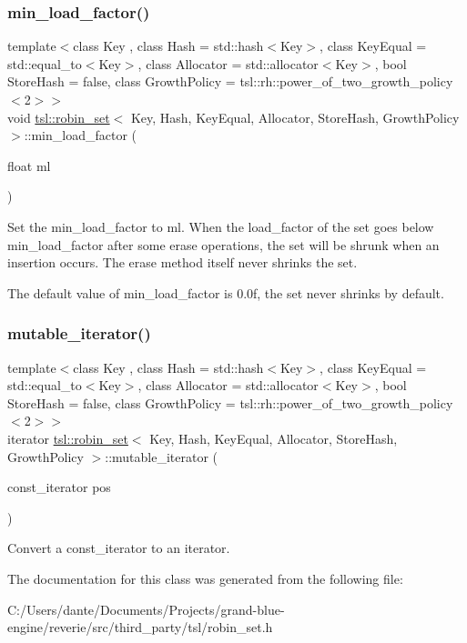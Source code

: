 \subsubsection{\texorpdfstring{min\_load\_factor()}{min\_load\_factor()}}
{\footnotesize\ttfamily template$<$class Key , class Hash  = std\+::hash$<$\+Key$>$, class Key\+Equal  = std\+::equal\+\_\+to$<$\+Key$>$, class Allocator  = std\+::allocator$<$\+Key$>$, bool Store\+Hash = false, class Growth\+Policy  = tsl\+::rh\+::power\+\_\+of\+\_\+two\+\_\+growth\+\_\+policy$<$2$>$$>$ \\
void \mbox{\hyperlink{classtsl_1_1robin__set}{tsl\+::robin\+\_\+set}}$<$ Key, Hash, Key\+Equal, Allocator, Store\+Hash, Growth\+Policy $>$\+::min\+\_\+load\+\_\+factor (\begin{DoxyParamCaption}\item[{float}]{ml }\end{DoxyParamCaption})\hspace{0.3cm}{\ttfamily [inline]}}

Set the {\ttfamily min\+\_\+load\+\_\+factor} to {\ttfamily ml}. When the {\ttfamily load\+\_\+factor} of the set goes below {\ttfamily min\+\_\+load\+\_\+factor} after some erase operations, the set will be shrunk when an insertion occurs. The erase method itself never shrinks the set.

The default value of {\ttfamily min\+\_\+load\+\_\+factor} is 0.\+0f, the set never shrinks by default. \mbox{\label{classtsl_1_1robin__set_aebd376e4762e1e4091df9cc19917334e}} 
\subsubsection{\texorpdfstring{mutable\_iterator()}{mutable\_iterator()}}
{\footnotesize\ttfamily template$<$class Key , class Hash  = std\+::hash$<$\+Key$>$, class Key\+Equal  = std\+::equal\+\_\+to$<$\+Key$>$, class Allocator  = std\+::allocator$<$\+Key$>$, bool Store\+Hash = false, class Growth\+Policy  = tsl\+::rh\+::power\+\_\+of\+\_\+two\+\_\+growth\+\_\+policy$<$2$>$$>$ \\
iterator \mbox{\hyperlink{classtsl_1_1robin__set}{tsl\+::robin\+\_\+set}}$<$ Key, Hash, Key\+Equal, Allocator, Store\+Hash, Growth\+Policy $>$\+::mutable\+\_\+iterator (\begin{DoxyParamCaption}\item[{const\+\_\+iterator}]{pos }\end{DoxyParamCaption})\hspace{0.3cm}{\ttfamily [inline]}}

Convert a const\+\_\+iterator to an iterator. 

The documentation for this class was generated from the following file\+:\begin{DoxyCompactItemize}
\item 
C\+:/\+Users/dante/\+Documents/\+Projects/grand-\/blue-\/engine/reverie/src/third\+\_\+party/tsl/robin\+\_\+set.\+h\end{DoxyCompactItemize}
